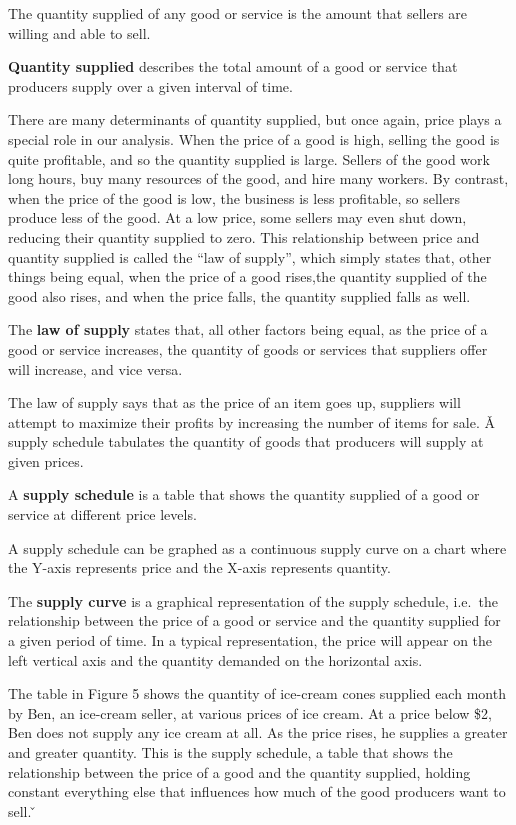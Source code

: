 The quantity supplied of any good or service is the amount that sellers are willing and able to sell.

\textbf{Quantity supplied} describes the total amount of a good or service that producers supply over a given interval
of time.
\ed

There are many determinants of quantity supplied, but once again, price plays a special role in our analysis. When
the price of a good is high, selling the good is quite profitable, and so the quantity supplied is large. Sellers of
the good work long hours, buy many resources of the good, and hire many workers. By contrast, when the price of the
good is low, the business is less profitable, so sellers produce less of the good. At a low price, some sellers may
even shut down, reducing their quantity supplied to zero. This relationship between price and quantity supplied is
called the ``law of supply'', which simply states that, other things being equal, when the price of a good rises,the
quantity supplied of the good also rises, and when the price falls, the quantity supplied falls as well.

The \textbf{law of supply} states that, all other factors being equal, as the price of a good or service increases,
the quantity of goods or services that suppliers offer will increase, and vice versa.
\ed

The law of supply says that as the price of an item goes up, suppliers will attempt to maximize their profits by
increasing the number of items for sale. \v

A supply schedule tabulates the quantity of goods that producers will supply at given prices.

A \textbf{supply schedule} is a table that shows the quantity supplied of a good or service at different price levels.
\ed

A supply schedule can be graphed as a continuous supply curve on a chart where the Y-axis represents price and the
X-axis represents quantity.

The \textbf{supply curve} is a graphical representation of the supply schedule, i.e.\ the relationship between the
price of a good or service and the quantity supplied for a given period of time. In a typical representation, the
price will appear on the left vertical axis and the quantity demanded on the horizontal axis.
\ed

\be
{}

The table in Figure 5 shows the quantity of ice-cream cones supplied each month by Ben, an ice-cream seller, at
various prices of ice cream. At a price below \$2, Ben does not supply any ice cream at all. As the price rises, he
supplies a greater and greater quantity. This is the supply schedule, a table that shows the relationship between the
price of a good and the quantity supplied, holding constant everything else that influences how much of the good
producers want to sell. \v

